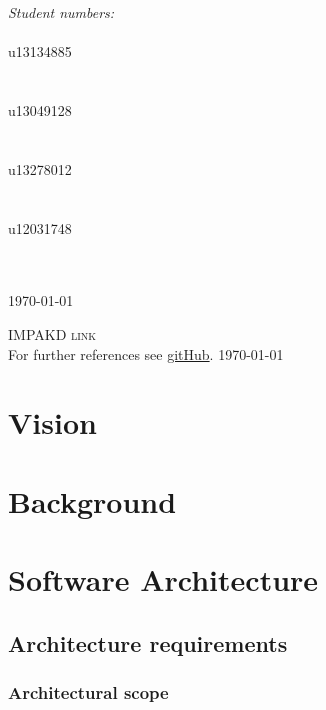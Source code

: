 \documentclass[a4paper,12pt]{article}
\begin{document}
\begin{titlepage}
\begin{center}
\begin{minipage}{0.4\textwidth}
\begin{flushright}
\emph{ \Large Student numbers:} \\[0.4cm]  
\emph{}\\
{\Large u13134885}\\
\emph{}\\
\emph{}\\
{\Large u13049128}\\
\emph{}\\
\emph{}\\
{\Large u13278012}\\
\emph{}\\
\emph{}\\
{\Large u12031748}\\
\emph{}\\
\emph{}\\

\end{flushright}
\end{minipage}


{\large \today}
\end{center}
\end{titlepage}
\renewcommand{\thesection}{\arabic{section}}

\newpage
\begin{center}
\textsc{\Large IMPAKD link}\\[0.5cm]
For further references see \href{https://github.com/u13278012/IMPAKD/}{gitHub}.
\today
\end{center}
\newpage
\tableofcontents{}

\newpage
\section{Vision}

\newpage
\section{Background}

\newpage
\section{Software Architecture}
\subsection{Architecture requirements}
\subsubsection{Architectural scope}
\end{document}
